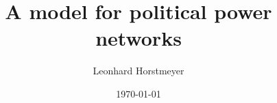 \documentclass[12pt]{article}
\begin{document}
\title{A model for political power networks}
\author{Leonhard Horstmeyer}
\date{\today}
\maketitle







\end{document}
